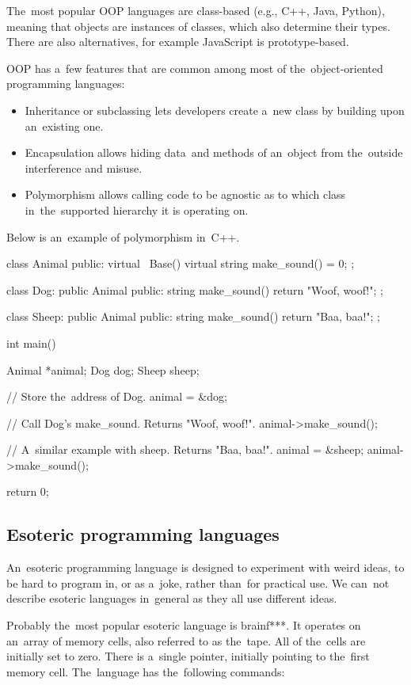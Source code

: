 The~most popular OOP languages are class-based (e.g., C++, Java, Python), meaning that objects are instances of classes, which also determine their types.
There are also alternatives, for example JavaScript is prototype-based.

OOP has a~few features that are common among most of the~object-oriented programming languages:
\begin{itemize}
    \item Inheritance or subclassing lets developers create a~new class by building upon an~existing one.
    \item Encapsulation allows hiding data~and methods of an~object from the~outside interference and misuse.
    \item Polymorphism allows calling code to be agnostic as to which class in~the~supported hierarchy it is operating on.
\end{itemize}

Below is an~example of polymorphism in~C++.
\begin{code}
class Animal {
public:
    virtual ~Base() { }
    virtual string make_sound() = 0;
};

class Dog: public Animal {
public:
    string make_sound() { 
        return "Woof, woof!"; 
    }
};

class Sheep: public Animal {
public:
    string make_sound() { 
        return "Baa, baa!"; 
    }
};

int main() {
    Animal *animal;
    Dog dog;
    Sheep sheep;

    // Store the~address of Dog.
    animal = &dog;

    // Call Dog's make_sound. Returns "Woof, woof!".
    animal->make_sound();

    // A~similar example with sheep. Returns "Baa, baa!".
    animal = &sheep;
    animal->make_sound();

    return 0;
}
\end{code}

\subsection{Esoteric programming languages}
An~esoteric programming language is designed to experiment with weird ideas, to be hard to program in, or as a~joke, rather than~for practical use. We can~not
describe esoteric languages in~general as they all use different ideas.

Probably the~most popular esoteric language is brainf***. It operates on an~array of memory cells, also referred to as the~tape. All of the~cells are initially
set to zero. There is a~single pointer, initially pointing to the~first memory cell. The~language has the~following commands:

